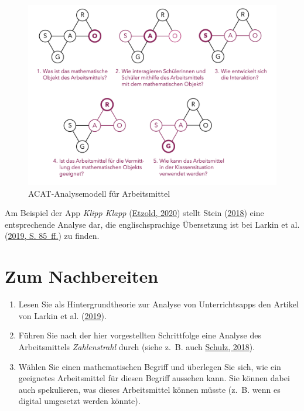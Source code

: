 \documentclass[
]{scrbook}
\theoremstyle{definition}
\theoremstyle{definition}
\theoremstyle{definition}
\theoremstyle{definition}
\theoremstyle{remark}
\begin{document}
\begin{figure}

{\centering \includegraphics[width=0.9\linewidth]{pictures/7-ACATAnalyse} 

}

\caption{ACAT-Analysemodell für Arbeitsmittel}\label{fig:ACATAnalyse}
\end{figure}

Am Beispiel der App \emph{Klipp Klapp} (\protect\hyperlink{ref-Etzold2020a}{Etzold, 2020}) stellt Stein (\protect\hyperlink{ref-Stein2018}{2018}) eine entsprechende Analyse dar, die englischsprachige Übersetzung ist bei Larkin et al. (\protect\hyperlink{ref-Larkin2019}{2019, S. 85~ff.}) zu finden.

\hypertarget{arbeitsmittel-nachbereitung}{%
\section{Zum Nachbereiten}\label{arbeitsmittel-nachbereitung}}

\begin{enumerate}
\def\labelenumi{\arabic{enumi}.}
\item
  Lesen Sie als Hintergrundtheorie zur Analyse von Unterrichtsapps den Artikel von Larkin et al. (\protect\hyperlink{ref-Larkin2019}{2019}).
\item
  Führen Sie nach der hier vorgestellten Schrittfolge eine Analyse des Arbeitsmittels \emph{Zahlenstrahl} durch (siehe z.~B. auch \protect\hyperlink{ref-Schulz2018}{Schulz, 2018}).
\item
  Wählen Sie einen mathematischen Begriff und überlegen Sie sich, wie ein geeignetes Arbeitsmittel für diesen Begriff aussehen kann. Sie können dabei auch spekulieren, was dieses Arbeitsmittel können müsste (z.~B. wenn es digital umgesetzt werden könnte).
\end{enumerate}
\end{document}
